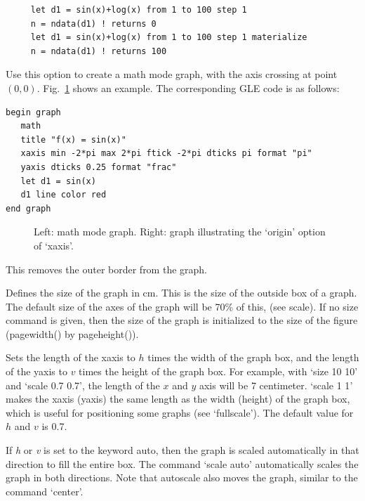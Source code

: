 \begin{commanddescription}
\begin{Verbatim}
     let d1 = sin(x)+log(x) from 1 to 100 step 1
     n = ndata(d1) ! returns 0
     let d1 = sin(x)+log(x) from 1 to 100 step 1 materialize
     n = ndata(d1) ! returns 100
\end{Verbatim}


\item[{\sf math}]
Use this option to create a math mode graph, with the axis crossing at point $(0,0)$. Fig.~\ref{grmath:fig} shows an example. The corresponding GLE code is as follows:

\begin{Verbatim}
begin graph
   math
   title "f(x) = sin(x)"
   xaxis min -2*pi max 2*pi ftick -2*pi dticks pi format "pi"
   yaxis dticks 0.25 format "frac"
   let d1 = sin(x)
   d1 line color red
end graph
\end{Verbatim}

\begin{figure}[tb]
\centering
\mbox{}
\caption{\label{grmath:fig}Left: math mode graph. Right: graph illustrating the `{\sf origin}' option of `{\sf xaxis}'.}
\end{figure}


\item[{\sf nobox}]
This removes the outer border from the graph.

\item[{\sf size {\it x y }}]
Defines the size of the graph in cm.  This is the size of the outside box of a graph. The default size of the axes of the graph will be 70\% of this, (see {\sf scale}). If no {\sf size} command is given, then the size of the graph is initialized to the size of the figure ({\sf pagewidth()} by {\sf pageheight()}).

\item[{\sf scale {\it h v}}]
Sets the length of the xaxis to $h$ times the width of the graph box, and the length of the yaxis to $v$ times the height of the graph box. For example, with `{\sf size 10 10}' and `{\sf scale 0.7 0.7}', the length of the $x$ and $y$ axis will be 7 centimeter. `{\sf scale 1 1}' makes the xaxis (yaxis) the same length as the width (height) of the graph box, which is useful for positioning some graphs (see `{\sf fullscale}'). The default value for $h$ and $v$ is 0.7.

If {\it h} or {\it v} is set to the keyword {\sf auto}, then the graph is scaled automatically in that direction to fill the entire box. The command `{\sf scale auto}' automatically scales the graph in both directions. Note that autoscale also moves the graph, similar to the command `{\sf center}'.


\end{commanddescription}

